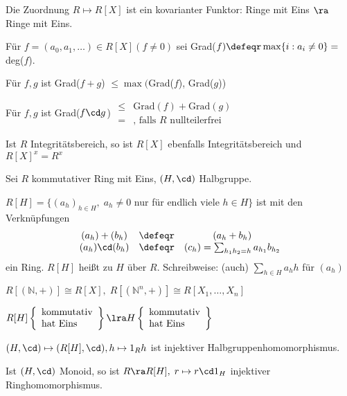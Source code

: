 \begin{Folg}
Die Zuordnung $R \mapsto R[X]$ ist ein
kovarianter Funktor: Ringe mit Eins $\ra$ Ringe mit Eins.
\newline {}
\end{Folg}

\begin{DefBem}
\begin{enum}
\item Für $f=(a_0,a_1,\dots) \in R[X] (f \neq 0)$ sei Grad($f) \defeqr
\max\{i: a_i \neq 0\} = $deg($f$).
\item Für $f,g$ ist Grad($f+g$) $\leq \max($Grad($f$), Grad($g$))
\item Für $f,g$ ist Grad($f\cd g$) $\begin{array}{cc} \leq & \mbox{Grad}(f) +
\mbox{Grad}(g) \\
= & \mbox{, falls } R \mbox{ nullteilerfrei} \end{array}$
\end{enum}
\end{DefBem}

\begin{Folg}
Ist $R$ Integritätsbereich, so ist $R[X]$
ebenfalls Integritätsbereich und $R[X]^x = R^x$
\end{Folg}

\begin{DefBem}
\label{2.13}
Sei $R$ kommutativer Ring mit Eins, $(H,\cd)$ Halbgruppe.
\begin{enum}
\item $R[H] = \{(a_h)_{h \in H},\; a_h \neq 0$ nur für endlich viele
$h\in H\}$ ist mit den Verknüpfungen \[\begin{array}{ccc}
(a_h)+(b_h) &\defeqr& (a_h + b_h) \\
(a_h)\cd(b_h) &\defeqr& (c_h) = \sum_{h_1 h_2 = h} a_{h_1} b_{h_2}
\end{array}\]
ein Ring. $R[H]$ heißt  zu $H$ über $R$.
\newline Schreibweise: (auch) $\sum_{h \in H} a_h h$ für $(a_h)$
\item $R[(\mathbb{N},+)] \cong R[X],\; R[(\mathbb{N}^n,+)] \cong
R[X_1,\dots,X_n]$
\item $R[H] \left\{\begin{array}{l} \mbox{kommutativ} \\ \mbox{hat Eins}
\end{array}\right\} \lra H \left\{\begin{array}{l} \mbox{kommutativ} \\ \mbox{hat Eins}
\end{array}\right\}$
\item $(H,\cd) \mapsto (R[H],\cd), h \mapsto 1_R h$ ist injektiver
Halbgruppenhomomorphismus.
\item Ist $(H,\cd)$ Monoid, so ist $R \ra R[H], \; r\mapsto r\cd
1_H$ injektiver Ringhomomorphismus. \end{enum} 
\end{DefBem}

